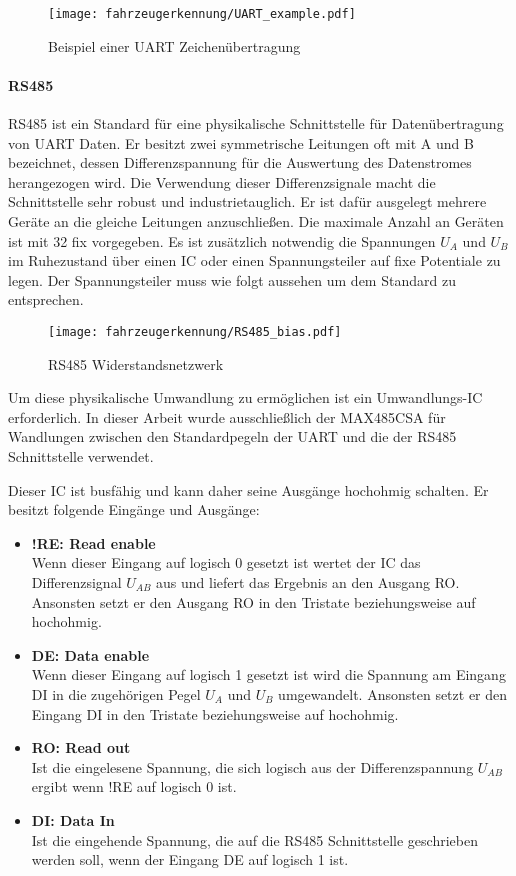 \begin{figure}[H]
    \centering
    \texttt{[image: fahrzeugerkennung/UART\_example.pdf]}
    \caption{Beispiel einer UART Zeichenübertragung}
\end{figure}

\paragraph{RS485}\label{sec:RS485}\mbox{}

RS485 ist ein Standard für eine physikalische Schnittstelle für Datenübertragung von UART Daten. Er besitzt zwei symmetrische Leitungen oft mit A und B bezeichnet, dessen Differenzspannung für die Auswertung
des Datenstromes herangezogen wird. Die Verwendung dieser Differenzsignale macht die Schnittstelle sehr robust und industrietauglich.
Er ist dafür ausgelegt mehrere Geräte an die gleiche Leitungen anzuschließen. Die maximale Anzahl an Geräten ist mit 32 fix vorgegeben. Es ist zusätzlich notwendig die Spannungen 
$U_{A}$ und $U_{B}$ im Ruhezustand über einen IC oder einen Spannungsteiler auf fixe Potentiale zu legen. Der Spannungsteiler muss wie folgt aussehen um dem Standard zu entsprechen.

\begin{figure}[H]
    \centering
    \texttt{[image: fahrzeugerkennung/RS485\_bias.pdf]}
    \caption{RS485 Widerstandsnetzwerk}
    \label{fig:rs485_bias}
\end{figure}

Um diese physikalische Umwandlung zu ermöglichen ist ein Umwandlungs-IC erforderlich. In dieser Arbeit wurde ausschließlich der MAX485CSA für Wandlungen zwischen den Standardpegeln der UART
und die der RS485 Schnittstelle verwendet.

Dieser IC ist busfähig und kann daher seine Ausgänge hochohmig schalten. Er besitzt folgende Eingänge und Ausgänge:
\begin{itemize}
    \item \textbf{!RE: Read enable} \\
    Wenn dieser Eingang auf logisch 0 gesetzt ist wertet der IC das Differenzsignal $U_{AB}$ aus und liefert das Ergebnis an den Ausgang RO.
    Ansonsten setzt er den Ausgang RO in den Tristate beziehungsweise auf hochohmig.
    \item \textbf{DE: Data enable} \\
    Wenn dieser Eingang auf logisch 1 gesetzt ist wird die Spannung am Eingang DI in die zugehörigen Pegel $U_{A}$ und $U_{B}$ umgewandelt.
    Ansonsten setzt er den Eingang DI in den Tristate beziehungsweise auf hochohmig.
    \item \textbf{RO: Read out} \\
    Ist die eingelesene Spannung, die sich logisch aus der Differenzspannung $U_{AB}$ ergibt wenn !RE auf logisch 0 ist.
    \item \textbf{DI: Data In} \\
    Ist die eingehende Spannung, die auf die RS485 Schnittstelle geschrieben werden soll, wenn der Eingang DE auf logisch 1 ist.
\end{itemize}


